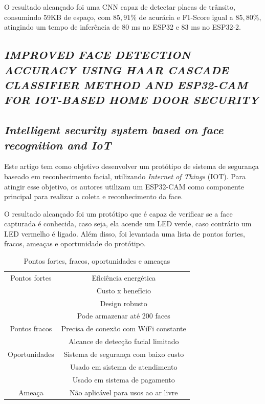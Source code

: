 O resultado alcançado foi uma CNN capaz de detectar placas de trânsito, consumindo 59KB de espaço, com $85,91\%$ de
acurácia e F1-Score igual a $85,80\%$, atingindo um tempo de inferência de 80 ms no ESP32 e 83 ms no ESP32-2.

\subsection{\textit{IMPROVED FACE DETECTION ACCURACY USING HAAR CASCADE CLASSIFIER METHOD AND ESP32-CAM FOR IOT-BASED HOME DOOR SECURITY}}

\subsection{\textit{Intelligent security system based on face recognition and IoT}}
Este artigo \cite{bagchi20222133} tem como objetivo desenvolver um protótipo de sistema de segurança baseado em reconhecimento facial,
utilizando \textit{Internet of Things} (IOT). Para atingir esse objetivo, os autores utilizam um ESP32-CAM como componente
principal para realizar a coleta e reconhecimento da face.

O resultado alcançado foi um protótipo que é capaz de verificar se a face capturada é conhecida, caso seja, ela acende um
LED verde, caso contrário um LED vermelho é ligado. Além disso, foi levantada uma lista de pontos fortes, fracos, ameaças
e oportunidade do protótipo.

\begin{center}
\begin{table}[htb]
\centering
\ABNTEXfontereduzida
\caption[Pontos fortes, fracos, oportunidades e ameaças]{Pontos fortes, fracos, oportunidades e ameaças}
\label{tabela_swot}
\begin{tabular}{ |c|c| }
	\hline
	Pontos fortes & Eficiência energética \\
		    & Custo x benefício \\
		    & Design robusto \\
		    & Pode armazenar até 200 faces \\
	\hline
	Pontos fracos & Precisa de conexão com WiFi constante \\
	 	    & Alcance de detecção facial limitado \\
	\hline
	Oportunidades & Sistema de segurança com baixo custo\\
		 & Usado em sistema de atendimento \\
		 & Usado em sistema de pagamento \\
	\hline
	Ameaça & Não aplicável para usos ao ar livre \\
	\hline
\end{tabular}
\end{table}
\end{center}

